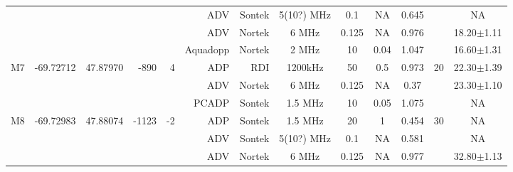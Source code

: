 \documentclass[letterpaper,10pt,landscape]{article}
\begin{document}
\begin{table}
\begin{tabular}{|r|c|c|r|r|r|r|c|c|c|c|c|c|}
    ~                   &                            &                           &                        &                       & ADV          & Sontek     & 5(10?) MHz& 0.1       & NA       & 0.645      &                    &  NA               \\ 
    ~                   &                            &                           &                        &                       & ADV          & Nortek     & 6 MHz     & 0.125     & NA       & 0.976      &                    &  18.20$\pm$1.11   \\ %
    ~                   &                            &                           &                        &                       & Aquadopp     & Nortek     & 2 MHz     & 10        & 0.04     & 1.047      &                    &  16.60$\pm$1.31   \\\hline
    \multirow{3}{*}{M7} & \multirow{3}{*}{-69.72712} & \multirow{3}{*}{47.87970} & \multirow{3}{*}{-890}  & \multirow{3}{*}{4}    & ADP          & RDI        & 1200kHz   & 50        & 0.5      & 0.973      & \multirow{3}{*}{20}&  22.30$\pm$1.39   \\ 
    ~                   &                            &                           &                        &                       & ADV          & Nortek     & 6 MHz     & 0.125     & NA       & 0.37       &                    &  23.30$\pm$1.10   \\ %
    ~                   &                            &                           &                        &                       & PCADP        & Sontek     & 1.5 MHz   & 10        & 0.05     & 1.075      &                    &  NA               \\\hline
    \multirow{4}{*}{M8} & \multirow{4}{*}{-69.72983} & \multirow{4}{*}{47.88074} & \multirow{4}{*}{-1123} & \multirow{4}{*}{-2}   & ADP          & Sontek     & 1.5 MHz   & 20        & 1        & 0.454      & \multirow{4}{*}{30}&  NA               \\ 
    ~                   &                            &                           &                        &                       & ADV          & Sontek     & 5(10?) MHz& 0.1       & NA       & 0.581      &                    &  NA               \\ 
    ~                   &                            &                           &                        &                       & ADV          & Nortek     & 6 MHz     & 0.125     & NA       & 0.977      &                    &  32.80$\pm$1.13   \\ %

\end{tabular}
\end{table}
\end{document}
